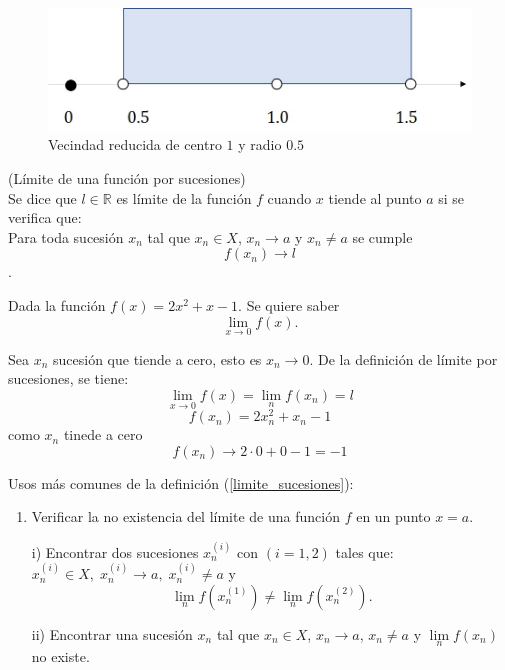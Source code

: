 \documentclass[10pt,twoside]{SelfArx} %
\begin{document}
\begin{figure}[h]
	\centering
	\includegraphics{vecindad_reducida}
	\caption{Vecindad reducida de centro $ 1 $ y radio $ 0.5 $}
	\label{vecindad_im2}
\end{figure}

\begin{thm}\label{limite_sucesiones}
	(Límite de una función por sucesiones)\\
		Se dice que $ l\in\mathbb{R} $ es l\'imite de la funci\'on $ f $ cuando $ x $ tiende al punto $ a $ si se verifica que:\\
	Para toda sucesión $ {x_{n}} $	tal que $ x_{n}\in X $, $ x_{n}\rightarrow a $ y $ x_{n}\neq a $ se cumple
	\[ f(x_{n})\rightarrow l \].
\end{thm}


\begin{ejemplo}
	Dada la función $ f(x)=2x^{2}+x-1 $. Se quiere saber \[ \lim\limits_{x\rightarrow0}f(x) .\]
	
	Sea $ {x_{n}} $ sucesión que tiende a cero, esto es $ x_{n}\rightarrow0 $.
	De la definición de límite por sucesiones, se tiene:
\[ \lim\limits_{x\rightarrow0}f(x)=\lim\limits_{n}f(x_{n})=l \]
\[ f(x_{n})=2x_{n}^{2}+x_{n}-1 \]
como $ x_{n} $ tinede a cero
\[ f(x_{n})\rightarrow2\cdot0+0-1=-1 \]

\end{ejemplo}

Usos más comunes de la  definición (\ref{limite_sucesiones}):\\
\begin{enumerate}
	\item Verificar la no existencia del límite de una función $ f $ en un punto $ x=a $.
	\item[i)]	Encontrar dos sucesiones $ {x_{n}^{(i)}} $ con $ (i=1,2) $ tales que: $ x_{n}^{(i)}\in X, \; x_{n}^{(i)}\rightarrow a, \; x_{n}^{(i)}\neq a $ y 
	\[ \lim\limits_{n}f(x_{n}^{(1)})\neq\lim\limits_{n}f(x_{n}^{(2)}). \]
	\item[ii)]	Encontrar una sucesión $ {x_{n}} $ tal que $ x_{n}\in X $, $ x_{n}\rightarrow a $, $ x_{n}\neq a $ y $ \lim\limits_{n}f(x_{n}) $ no existe.
\end{enumerate}
\end{document}
